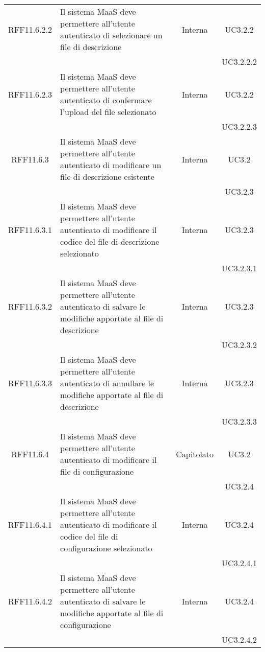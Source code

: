 \begin{longtable}{|c|p{6cm}|c|c|}
\midrule
RFF11.6.2.2
& Il sistema MaaS deve permettere all'utente autenticato di selezionare un file di descrizione
& Interna
& UC3.2.2\\
& & & UC3.2.2.2\\

\midrule
RFF11.6.2.3
& Il sistema MaaS deve permettere all'utente autenticato di confermare l'upload del file selezionato
& Interna
& UC3.2.2\\
& & & UC3.2.2.3\\


\midrule
RFF11.6.3
& Il sistema MaaS deve permettere all'utente autenticato di modificare un file di descrizione esistente
& Interna
& UC3.2\\
& & & UC3.2.3\\

\midrule
RFF11.6.3.1
& Il sistema MaaS deve permettere all'utente autenticato di modificare il codice del file di descrizione selezionato
& Interna
& UC3.2.3\\
& & & UC3.2.3.1\\

\midrule
RFF11.6.3.2
& Il sistema MaaS deve permettere all'utente autenticato di salvare le modifiche apportate al file di descrizione
& Interna
& UC3.2.3\\
& & & UC3.2.3.2\\

\midrule
RFF11.6.3.3
& Il sistema MaaS deve permettere all'utente autenticato di annullare le modifiche apportate al file di descrizione
& Interna
& UC3.2.3\\
& & & UC3.2.3.3\\

\midrule
RFF11.6.4
& Il sistema MaaS deve permettere all'utente autenticato di modificare il file di configurazione
& Capitolato
& UC3.2\\
& & & UC3.2.4\\

\midrule
RFF11.6.4.1
& Il sistema MaaS deve permettere all'utente autenticato di modificare il codice del file di configurazione selezionato
& Interna
& UC3.2.4\\
& & & UC3.2.4.1\\

\midrule
RFF11.6.4.2
& Il sistema MaaS deve permettere all'utente autenticato di salvare le modifiche apportate al file di configurazione
& Interna
& UC3.2.4\\
& & & UC3.2.4.2\\


\end{longtable}
